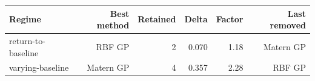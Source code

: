 \begin{tabular}{lrrrrr}
\toprule
Regime & Best method & Retained & Delta & Factor & Last removed \\
\midrule
return-to-baseline & RBF GP & 2 & 0.070 & 1.18 & Matern GP \\
varying-baseline & Matern GP & 4 & 0.357 & 2.28 & RBF GP \\
\bottomrule
\end{tabular}
